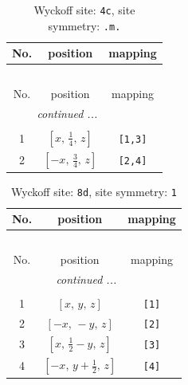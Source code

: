 \documentclass[fleqn,8pt]{jsarticle}
\begin{document}
\renewcommand{\arraystretch}{1.2}
\begin{longtable}{ccc}
\caption{Wyckoff site: {\tt 4c}, site symmetry: {\tt .m.}}
 \\
 \hline \hline
No. & position & mapping \\ \hline \endfirsthead

\multicolumn{2}{l}{\tablename\ \thetable{}} \\
 \hline \hline
No. & position & mapping \\ \hline \endhead

 \hline \hline
\multicolumn{2}{r}{\footnotesize\it continued ...} \\ \endfoot

 \hline \hline
\multicolumn{2}{r}{} \\ \endlastfoot

1 & $\left[ x,\, \frac{1}{4},\, z \right]$ & {\tt [1,3]} \\ \hline
2 & $\left[ - x,\, \frac{3}{4},\, z \right]$ & {\tt [2,4]} \\
\end{longtable}
\renewcommand{\arraystretch}{1.2}
\begin{longtable}{ccc}
\caption{Wyckoff site: {\tt 8d}, site symmetry: {\tt 1}}
 \\
 \hline \hline
No. & position & mapping \\ \hline \endfirsthead

\multicolumn{2}{l}{\tablename\ \thetable{}} \\
 \hline \hline
No. & position & mapping \\ \hline \endhead

 \hline \hline
\multicolumn{2}{r}{\footnotesize\it continued ...} \\ \endfoot

 \hline \hline
\multicolumn{2}{r}{} \\ \endlastfoot

1 & $\left[ x,\, y,\, z \right]$ & {\tt [1]} \\ \hline
2 & $\left[ - x,\, - y,\, z \right]$ & {\tt [2]} \\ \hline
3 & $\left[ x,\, \frac{1}{2} - y,\, z \right]$ & {\tt [3]} \\ \hline
4 & $\left[ - x,\, y + \frac{1}{2},\, z \right]$ & {\tt [4]} \\
\end{longtable}
\end{document}
